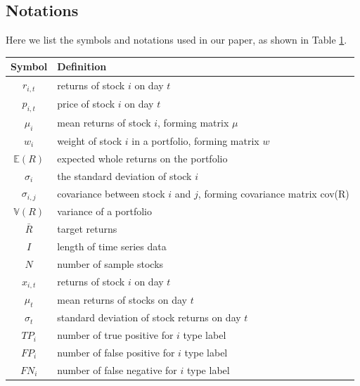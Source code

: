 \documentclass[default,iicol]{sn-jnl}%
\begin{document}
\begin{appendices}
\section{Notations}\label{secA1}
Here we list the symbols and notations used in our paper, as shown in Table \ref{taba1}.
\begin{table}[htbp]
	\begin{tabular}{cl}
			\toprule
			\multicolumn{1}{m{3cm}}{\centering Symbol}
			&\multicolumn{1}{m{8cm}}{Definition}\\
			\midrule
			$r_{i,t}$&returns of stock $i$ on day $t$\\
			$p_{i,t}$&price of stock $i$ on day $t$\\
			$\mu_{i}$&mean returns of stock $i$, forming matrix $\mu$\\
			$w_{i}$&weight of stock $i$ in a portfolio, forming matrix $w$ \\
			$\mathbb{E}(R)$ &expected whole returns on the portfolio\\
			$\sigma _{i}$ &the standard deviation of stock $i$\\
			$\sigma _{i,j}$ &covariance between stock $i$ and $j$, forming covariance matrix cov(R)\\
			$\mathbb{V}(R)$ &variance of a portfolio\\
			$\bar{R}$ &target returns\\
			$I$ &length of time series data\\
			$N$ &number of sample stocks\\
			$x_{i,t}$ &returns of stock $i$ on day $t$\\
			$\mu_{t}$ &mean returns of stocks on day $t$\\
			$\sigma_{t}$ &standard deviation of stock returns on day $t$\\
			$TP_{i} $ &number of true positive for $i$ type label\\
			$FP_{i} $ &number of false positive for $i$ type label\\
			$FN_{i} $ &number of false negative for $i$ type label\\
	\end{tabular}
	\label{taba1}
\end{table}
\clearpage


\end{appendices}
\end{document}
